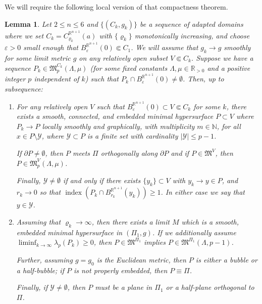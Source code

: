 \documentclass[10pt]{amsart}
\let\mathcal\mathscr
\newcounter{cas}
\DeclareMathOperator{\indx}{index}
\newtheorem{lem}[thm]{Lemma}
\theoremstyle{definition}
\newcommand{\R}{\mathbb{R}}
\newcommand{\N}{\mathbb{N}}
\let\eps\varepsilon
\let\cemb\Subset
\begin{document}
We will require the following local version of that compactness theorem.

\begin{lem}\label{lemma:local}
Let $2\leq n \leq 6$ and $\{(C_{k}, g_k)\}$ be a sequence of adapted domains where we set $C_k=C^{\R^{n+1}}_{\varrho_k}(a)$ with $\{\varrho_k\}$ monotonically increasing, and choose $\eps >0$ small enough that $B^{\R^{n+1}}_\eps(0)\cemb C_1$. We will assume that $g_k\to g$ smoothly for some limit metric $g$ on any relatively open subset $V\cemb C_k$. Suppose we have a sequence $P_k\in \mathfrak{M}^{C_k}_p(\Lambda,\mu)$ (for some fixed constants $\Lambda, \mu\in \R_{>0}$ and a positive integer $p$ independent of $k$) such that $P_k\cap B^{\R^{n+1}}_{\eps}(0)\neq \emptyset$.
Then, up to subsequence:

\begin{enumerate}
\item For\label{lemma:local1} any relatively open $V$ such that $B_\eps^{\R^{n+1}}(0)\subset V\cemb C_k$ for some $k$, there exists a smooth, connected, and embedded minimal hypersurface $P\subset V$ where $P_k \to P$ locally smoothly and graphically, with multiplicity $m\in \N$, for all $x\in P\setminus \mathcal{Y}$, where $\mathcal{Y}\subset P$ is a finite set with cardinality $|\mathcal{Y}|\leq p-1$.

If $\partial P\neq\emptyset$, then $P$ meets $\Pi$ orthogonally along $\partial P$ and if $P \in \mathfrak{M}^V$, then $P \in \mathfrak{M}^V_p(\Lambda,\mu)$.

Finally, $\mathcal{Y}\neq \emptyset$ if and only if there exists $\{y_k\}\subset V$ with $y_k\to y\in P$, and $r_k\to 0$ so that $\indx(P_k\cap B^{\R^{n+1}}_{r_k}(y_k))\geq 1$. In either case we say that $y\in \mathcal{Y}$.

\item\label{lemma:local2} Assuming that $\varrho_k \to \infty$, then there exists a limit $M$ which is a smooth, embedded minimal hypersurface in $(\Pi_1,g)$.
If we additionally assume $\liminf_{k\to\infty}\lambda_p(P_k)\!\geq\!0$, then $P \in \mathfrak{M}^{\Pi_1}$ implies $P \in \mathfrak{M}^{\Pi_1}(\Lambda,p-1)$.

Further, assuming $g=g_0$ is the Euclidean metric, then $P$ is either a bubble or a half-bubble; if $P$ is not properly embedded, then $P\equiv \Pi$.

Finally, if $\mathcal{Y}\neq \emptyset$, then $P$ must be a plane in $\Pi_1$ or a half-plane orthogonal to $\Pi$.
\end{enumerate}
\end{lem}
\end{document}
